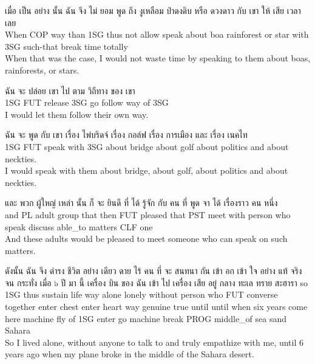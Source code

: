 \documentclass{book}
\begin{document}
	\begin{exe}
		\ex 
		\gll เมื่อ เป็น อย่าง นั้น ฉัน จึง ไม่ ยอม พูด ถึง งูเหลือม ป่าดงดิบ หรือ ดวงดาว กับ เขา ให้ เสีย เวลา เลย\\
		When \textsc{COP} way than \textsc{1SG} thus not allow speak about boa rainforest or star with \textsc{3SG} such-that break time totally\\
		When that was the case, I would not waste time by speaking to them about boas, rainforests, or stars.
	\end{exe}

	\begin{exe}
		\ex 
		\gll ฉัน จะ ปล่อย เขา ไป ตาม วิถีทาง ของ เขา\\
		\textsc{1SG} \textsc{FUT} release \textsc{3SG} go follow way of \textsc{3SG}\\
		I would let them follow their own way.
	\end{exe}

	\begin{exe}
		\ex 
		\gll ฉัน จะ พูด กับ เขา เรื่อง ไพ่บริดจ์ เรื่อง กอล์ฟ เรื่อง การเมือง และ เรื่อง เนคไท\\
		\textsc{1SG} \textsc{FUT} speak with \textsc{3SG} about bridge about golf about politics and about neckties.\\
		I would speak with them about bridge, about golf, about politics and about neckties.
	\end{exe}

	\begin{exe}
		\ex 
		\gll และ พวก ผู้ใหญ่ เหล่า นั้น ก็ จะ ยินดี ที่ ได้ รู้จัก กับ คน ที่ พูด จา ได้ เรื่องราว คน หนึ่ง\\
		and \textsc{PL} adult group that then \textsc{FUT} pleased that \textsc{PST} meet with person who speak discuss able\_to matters \textsc{CLF} one\\
		And these adults would be pleased to meet someone who can speak on such matters.
	\end{exe}

	\begin{exe}
		\ex 
		\gll ดังนั้น ฉัน จึง ดำรง ชีวิต อย่าง เดียว ดาย ไร้ คน ที่ จะ สนทนา กัน เข้า อก เข้า ใจ อย่าง แท้ จริง จน กระทั่ง เมื่อ ๖ ปี มา นี้ เครื่อง บิน ของ ฉัน เข้า ไป เครื่อง เสีย อยู่ กลาง ทะเล ทราย สะฮารา
		so \textsc{1SG} thus sustain life way alone lonely without person who \textsc{FUT} converse together enter chest enter heart way genuine true until until when six years come here machine fly of \textsc{1SG} enter go machine break \textsc{PROG} middle\_of sea sand Sahara\\
		So I lived alone, without anyone to talk to and truly empathize with me, until 6 years ago when my plane broke in the middle of the Sahara desert.\\
	\end{exe}
\end{document}
